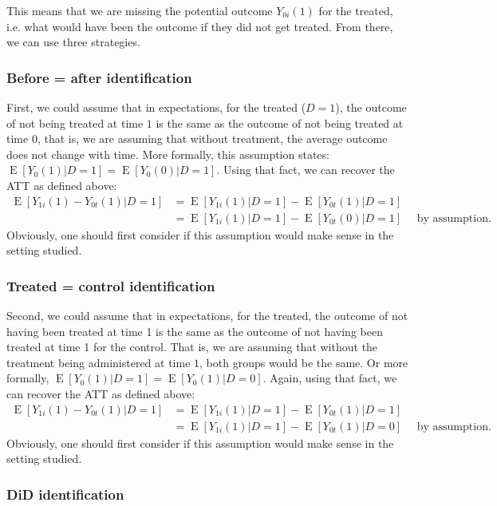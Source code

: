 \documentclass[12pt]{report}
\newcommand{\E}[1]{\operatorname{E}\left[#1\right]}
\begin{document}
This means that we are missing the potential outcome $Y_{0i}(1)$ for the treated, i.e. what would have been the outcome if they did not get treated. From there, we can use three strategies.

\subsubsection{Before = after identification} 

First, we could assume that in expectations, for the treated ($D=1$), the outcome of not being treated at time $1$ is the same as the outcome of not being treated at time $0$, that is, we are assuming that without treatment, the average outcome does not change with time. More formally, this assumption states: $\E{Y_0(1)\vert D=1} = \E{Y_0(0)\vert D=1}$. Using that fact, we can recover the ATT as defined above: \begin{align*}
\E{Y_{1i}(1) - Y_{0t}(1)\vert D=1} & = \E{Y_{1i}(1)\vert D=1} - \E{Y_{0t}(1)\vert D=1} \\
& = \E{Y_{1i}(1)\vert D=1} - \E{Y_{0t}(0)\vert D=1} \quad \text{ by assumption.}
\end{align*} Obviously, one should first consider if this assumption would make sense in the setting studied.

\subsubsection{Treated = control identification}

Second, we could assume that in expectations, for the treated, the outcome of not having been treated at time 1 is the same as the outcome of not having been treated at time 1 for the control. That is, we are assuming that without the treatment being administered at time $1$, both groups would be the same. Or more formally, $\E{Y_0(1)\vert D=1} = \E{Y_0(1)\vert D=0}$. Again, using that fact, we can recover the ATT as defined above: \begin{align*}
\E{Y_{1i}(1) - Y_{0t}(1)\vert D=1} & = \E{Y_{1i}(1)\vert D=1} - \E{Y_{0t}(1)\vert D=1} \\
& = \E{Y_{1i}(1)\vert D=1} - \E{Y_{0t}(1)\vert D=0} \quad \text{ by assumption.}
\end{align*} Obviously, one should first consider if this assumption would make sense in the setting studied.

\subsubsection{DiD identification}
\end{document}
